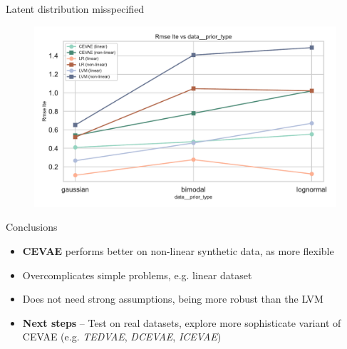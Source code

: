 \documentclass[10pt]{beamer}
\begin{document}
\begin{frame}{Latent distribution misspecified}
    \begin{figure}[H]
      \includegraphics[width=\textwidth]{images/MyRun_data__prior_type--rmse_ite.pdf}
    \end{figure}
\end{frame}




\begin{frame}{Conclusions}

\begin{itemize}\setlength\itemsep{6pt}

  \item \textbf{CEVAE} performs better on non-linear synthetic data, as more flexible

  \item Overcomplicates simple problems, e.g. linear dataset

  \item Does not need strong assumptions, being more robust than the LVM

  \item \textbf{Next steps} -- 
        Test on real datasets, explore more sophisticate variant of CEVAE (e.g. \emph{TEDVAE}, \emph{DCEVAE}, \emph{ICEVAE})

\end{itemize}

\end{frame}
\end{document}
